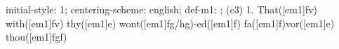 initial-style: 1;
centering-scheme: english;
def-m1: \grealign;
(c3) 1. That([em1]fv) with([em1]fv) thy([em1]e) wont([em1]fg/hg)-ed([em1]f) fa([em1]f)vor([em1]e) thou([em1]fgf)